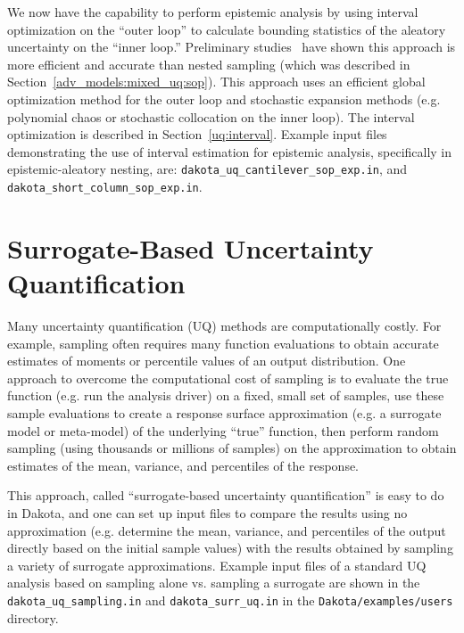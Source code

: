 We now have the capability to perform epistemic analysis by 
using interval optimization on the ``outer loop'' to calculate bounding 
statistics of the aleatory uncertainty on the ``inner loop.''  
Preliminary studies~\cite{Eld09b} have shown this approach is more efficient 
and accurate than nested sampling (which was described in 
Section~\ref{adv_models:mixed_uq:sop}).  This approach uses 
an efficient global optimization method for the outer loop and 
stochastic expansion methods (e.g. polynomial chaos or stochastic 
collocation on the inner loop).  The interval optimization is described in 
Section~\ref{uq:interval}.  Example input files demonstrating 
the use of interval estimation for epistemic analysis, 
specifically in epistemic-aleatory nesting, are: 
\texttt{dakota\_uq\_cantilever\_sop\_exp.in}, and
\texttt{dakota\_short\_column\_sop\_exp.in}. 

\section{Surrogate-Based Uncertainty Quantification} \label{adv_models:sbuq}

Many uncertainty quantification (UQ) methods are computationally costly. 
For example, sampling often requires many function evaluations to obtain 
accurate estimates of moments or percentile values of an output distribution.  
One approach to overcome the computational cost of sampling is to 
evaluate the true function (e.g. run the analysis driver) on a fixed, small
set of samples, use these sample evaluations to 
create a response surface approximation (e.g. a surrogate model or meta-model)
of the underlying ``true'' function, then perform random sampling (using 
thousands or millions of samples) on the approximation to obtain estimates 
of the mean, variance, and percentiles of the response. 

This approach, called ``surrogate-based uncertainty quantification'' 
is easy to do in Dakota, and one can set up input files to compare the 
results using no approximation (e.g. determine the mean, variance, and 
percentiles of the output directly based on the initial sample values) 
with the results obtained by sampling a variety of surrogate approximations.  
Example input files of a standard UQ analysis based on sampling alone vs. 
sampling a surrogate are shown in the \texttt{dakota\_uq\_sampling.in} and 
\texttt{dakota\_surr\_uq.in} in the \texttt{Dakota/examples/users}
directory. 

